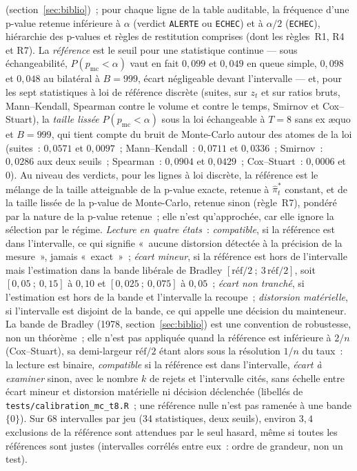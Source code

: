 \documentclass[a4paper,11pt]{article}
\newcommand{\code}[1]{\texttt{\small #1}}
\begin{document}
(section~\ref{sec:biblio})~; pour chaque ligne de la table auditable, la fréquence d'une
p-value retenue inférieure à $\alpha$ (verdict \code{ALERTE} ou \code{ECHEC}) et à $\alpha/2$
(\code{ECHEC}), hiérarchie des p-values et règles de restitution comprises (dont les
règles~R1, R4 et R7). La \emph{référence} est le seuil pour une statistique continue --- sous
échangeabilité, $P(p_{\mathrm{mc}} < \alpha)$ vaut en fait $0{,}099$ et $0{,}049$ en queue
simple, $0{,}098$ et $0{,}048$ au bilatéral à $B = 999$, écart négligeable devant
l'intervalle --- et, pour les sept statistiques à loi de référence discrète (suites, sur $z_t$
et sur ratios bruts, Mann--Kendall, Spearman contre le volume et contre le temps, Smirnov et
Cox--Stuart), la \emph{taille lissée} $P(p_{\mathrm{mc}} < \alpha)$ sous la loi échangeable à
$T = 8$ sans ex \ae quo et $B = 999$, qui tient compte du bruit de Monte-Carlo autour des
atomes de la loi (suites~: $0{,}0571$ et $0{,}0097$~; Mann--Kendall~: $0{,}0711$ et
$0{,}0336$~; Smirnov~: $0{,}0286$ aux deux seuils~; Spearman~: $0{,}0904$ et $0{,}0429$~;
Cox--Stuart~: $0{,}0006$ et $0$). Au niveau des verdicts, pour les lignes à loi discrète, la
référence est le mélange de la taille atteignable de la p-value exacte, retenue à
$\hat\pi^{*}_t$ constant, et de la taille lissée de la p-value de Monte-Carlo, retenue sinon
(règle~R7), pondéré par la nature de la p-value retenue~; elle n'est qu'approchée, car elle
ignore la sélection par le régime. \emph{Lecture en quatre états}~: \emph{compatible}, si la
référence est dans l'intervalle, ce qui signifie «~aucune distorsion détectée à la précision
de la mesure~», jamais «~exact~»~; \emph{écart mineur}, si la référence est hors de
l'intervalle mais l'estimation dans la bande libérale de Bradley $[\mathrm{réf}/2~;~3\,
\mathrm{réf}/2]$, soit $[0{,}05~;~0{,}15]$ à $0{,}10$ et $[0{,}025~;~0{,}075]$ à
$0{,}05$~; \emph{écart non tranché}, si l'estimation est hors de la bande et l'intervalle la
recoupe~; \emph{distorsion matérielle}, si l'intervalle est disjoint de la bande, ce qui
appelle une décision du mainteneur. La bande de Bradley (1978, section~\ref{sec:biblio}) est
une convention de robustesse, non un théorème~; elle n'est pas appliquée quand la référence
est inférieure à $2/n$ (Cox--Stuart), sa demi-largeur $\mathrm{réf}/2$ étant alors sous la
résolution $1/n$ du taux~: la lecture est binaire, \emph{compatible} si la référence est dans
l'intervalle, \emph{écart à examiner} sinon, avec le nombre $k$ de rejets et l'intervalle cités,
sans échelle entre écart mineur et distorsion matérielle ni décision déclenchée (libellés de
\code{tests/calibration\_mc\_t8.R}~; une référence nulle n'est pas ramenée à une bande
$\{0\}$). Sur 68 intervalles par
jeu (34 statistiques, deux seuils), environ $3{,}4$ exclusions de la référence sont attendues
par le seul hasard, même si toutes les références sont justes (intervalles corrélés entre
eux~: ordre de grandeur, non un test).
\end{document}
